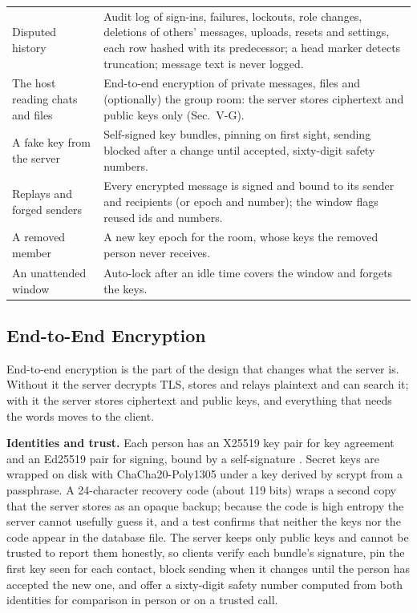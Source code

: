 \documentclass[conference]{IEEEtran}
\begin{document}
\begin{table}[t]
\begin{tabularx}{\textwidth}{@{}>{\raggedright\arraybackslash}p{3.6cm} Y@{}}
Disputed history & Audit log of sign-ins, failures, lockouts, role changes, deletions of others' messages, uploads, resets and settings, each row hashed with its predecessor; a head marker detects truncation; message text is never logged. \\
The host reading chats and files & End-to-end encryption of private messages, files and (optionally) the group room: the server stores ciphertext and public keys only (Sec.~V-G). \\
A fake key from the server & Self-signed key bundles, pinning on first sight, sending blocked after a change until accepted, sixty-digit safety numbers. \\
Replays and forged senders & Every encrypted message is signed and bound to its sender and recipients (or epoch and number); the window flags reused ids and numbers. \\
A removed member & A new key epoch for the room, whose keys the removed person never receives. \\
An unattended window & Auto-lock after an idle time covers the window and forgets the keys. \\
\bottomrule
\end{tabularx}
\end{table}
\subsection{End-to-End Encryption}\label{sec:e2ee}
End-to-end encryption is the part of the design that changes what the server is. Without it the server decrypts TLS, stores and relays plaintext and can search it; with it the server stores ciphertext and public keys, and everything that needs the words moves to the client.

\textbf{Identities and trust.} Each person has an X25519 key pair for key agreement and an Ed25519 pair for signing, bound by a self-signature \cite{rfc7748,rfc8032}. Secret keys are wrapped on disk with ChaCha20-Poly1305 \cite{rfc8439} under a key derived by scrypt from a passphrase. A 24-character recovery code (about 119 bits) wraps a second copy that the server stores as an opaque backup; because the code is high entropy the server cannot usefully guess it, and a test confirms that neither the keys nor the code appear in the database file. The server keeps only public keys and cannot be trusted to report them honestly, so clients verify each bundle's signature, pin the first key seen for each contact, block sending when it changes until the person has accepted the new one, and offer a sixty-digit safety number computed from both identities for comparison in person or on a trusted call.
\end{document}

